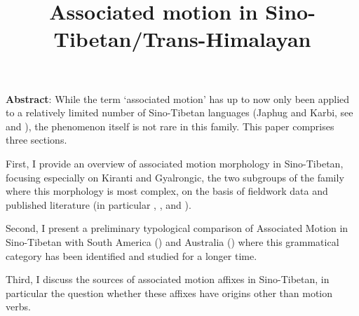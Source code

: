 \documentclass[oneside,a4paper,11pt]{article}
\begin{document}
 
\title{Associated motion in Sino-Tibetan/Trans-Himalayan}
\maketitle
\textbf{Abstract}: While the term `associated motion' has up to now only been applied to a relatively limited number of Sino-Tibetan languages (Japhug and Karbi, see \citealt{jacques13harmonization} and \citealt{konnerth15cisloc}), the phenomenon itself is not rare in this family. This paper comprises three sections. 

First, I provide an overview of associated motion morphology in Sino-Tibetan, focusing especially on Kiranti and Gyalrongic, the two subgroups of the family where this morphology is most complex,  on the basis of fieldwork data and published literature (in particular \citealt{driem87}, \citealt{driem93dumi}, \citealt{doornenbal09} and \citealt{schackow15yakkha}). 

Second, I present a preliminary typological comparison of Associated Motion in Sino-Tibetan with South America (\citealt{guillaume16am}) and Australia (\citealt{koch84associated.motion}) where this grammatical category has been identified and studied for a longer time. 

Third, I discuss the sources of associated motion affixes in Sino-Tibetan, in particular the question whether these affixes have origins other than motion verbs.





 
\end{document}
